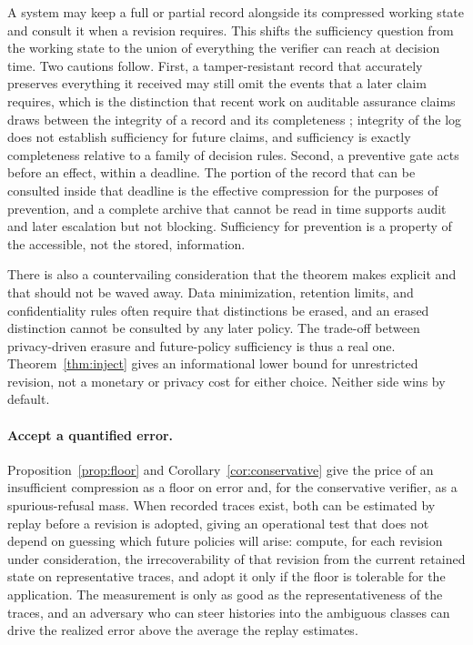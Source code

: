\documentclass[11pt]{article}
\theoremstyle{definition}
\theoremstyle{remark}
\begin{document}
A system may keep a full or partial record alongside its compressed working state and consult it when a revision requires. This shifts the sufficiency question from the working state to the union of everything the verifier can reach at decision time. Two cautions follow. First, a tamper-resistant record that accurately preserves everything it received may still omit the events that a later claim requires, which is the distinction that recent work on auditable assurance claims draws between the integrity of a record and its completeness \cite{auditable}; integrity of the log does not establish sufficiency for future claims, and sufficiency is exactly completeness relative to a family of decision rules. Second, a preventive gate acts before an effect, within a deadline. The portion of the record that can be consulted inside that deadline is the effective compression for the purposes of prevention, and a complete archive that cannot be read in time supports audit and later escalation but not blocking. Sufficiency for prevention is a property of the accessible, not the stored, information.

There is also a countervailing consideration that the theorem makes explicit and that should not be waved away. Data minimization, retention limits, and confidentiality rules often require that distinctions be erased, and an erased distinction cannot be consulted by any later policy. The trade-off between privacy-driven erasure and future-policy sufficiency is thus a real one. Theorem~\ref{thm:inject} gives an informational lower bound for unrestricted revision, not a monetary or privacy cost for either choice. Neither side wins by default.

\paragraph{Accept a quantified error.}
Proposition~\ref{prop:floor} and Corollary~\ref{cor:conservative} give the price of an insufficient compression as a floor on error and, for the conservative verifier, as a spurious-refusal mass. When recorded traces exist, both can be estimated by replay before a revision is adopted, giving an operational test that does not depend on guessing which future policies will arise: compute, for each revision under consideration, the irrecoverability of that revision from the current retained state on representative traces, and adopt it only if the floor is tolerable for the application. The measurement is only as good as the representativeness of the traces, and an adversary who can steer histories into the ambiguous classes can drive the realized error above the average the replay estimates.
\end{document}
